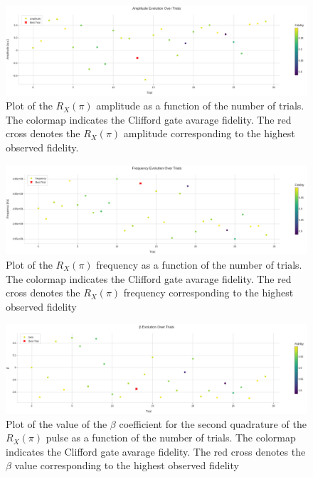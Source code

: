 \begin{figure}[h!]
    \centering
    \includegraphics[width=\textwidth]{figures/png/RB_optimization/Optuna/30/amplitude.png}
    \caption{Plot of the $R_X(\pi)$ amplitude as a function of the number of trials.
    The colormap indicates the Clifford gate avarage fidelity.
    The red cross denotes the $R_X(\pi)$ amplitude corresponding to the highest observed fidelity.}
    \label{fig:optuna30:amplitude}
\end{figure}

\begin{figure}[h!]
    \centering
    \includegraphics[width=\textwidth]{figures/png/RB_optimization/Optuna/30/frequency.png}
    \caption{Plot of the $R_X(\pi)$ frequency as a function of the number of trials. 
    The colormap indicates the Clifford gate avarage fidelity.  
    The red cross denotes the $R_X(\pi)$ frequency corresponding to the highest observed fidelity}
    \label{fig:optuna30:frequency}
\end{figure}

\begin{figure}[h!]
    \centering
    \includegraphics[width=\textwidth]{figures/png/RB_optimization/Optuna/30/beta.png}
    \caption{Plot of the value of the $\beta$ coefficient for the second quadrature of the $R_X(\pi)$ pulse as a function of the number of trials. 
    The colormap indicates the Clifford gate avarage fidelity.  
    The red cross denotes the $\beta$ value corresponding to the highest observed fidelity}
    \label{fig:optuna30:beta}
\end{figure}

